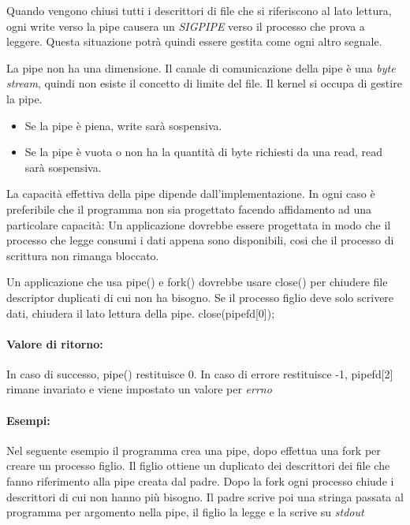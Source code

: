 \documentclass
[10pt,        %
 a4paper,     %
 onecolumn,   %
 fleqn,       %
 oneside,     %
 notitlepage, %
]{article}    %
\begin{document}


Quando vengono chiusi tutti i descrittori di file che si riferiscono al lato lettura, ogni write verso la pipe causera un \textit{SIGPIPE} verso il processo che prova a leggere. Questa situazione potrà quindi essere gestita come ogni altro segnale.



La pipe non ha una dimensione. Il canale di comunicazione della pipe è una \textit{byte stream}, quindi non esiste il concetto di limite del file. Il kernel si occupa di gestire la pipe.
\begin{itemize}
    \item Se la pipe è piena, write sarà sospensiva.
    \item Se la pipe è vuota o non ha la quantità di byte richiesti da una read, read sarà sospensiva.
\end{itemize}

La capacità effettiva della pipe dipende dall'implementazione. In ogni caso è preferibile che il programma non sia progettato facendo affidamento ad una particolare capacità: Un applicazione dovrebbe essere progettata in modo che il processo che legge consumi i dati appena sono disponibili, cosi che il processo di scrittura non rimanga bloccato.

Un applicazione che usa pipe() e fork() dovrebbe usare close() per chiudere file descriptor duplicati di cui non ha bisogno. Se il processo figlio deve solo scrivere dati, chiudera il lato lettura della pipe. close(pipefd[0]);



\paragraph{Valore di ritorno:}
In caso di successo, pipe() restituisce 0. In caso di errore restituisce -1, pipefd[2] rimane invariato e viene impostato un valore per \textit{errno}

\paragraph{Esempi:}
Nel seguente esempio il programma crea una pipe, dopo effettua una fork per creare un processo figlio. Il figlio ottiene un duplicato dei descrittori dei file che fanno riferimento alla pipe creata dal padre. Dopo la fork ogni processo chiude i descrittori di cui non hanno più bisogno. Il padre scrive poi una stringa passata al programma per argomento nella pipe, il figlio la legge e la scrive su \textit{stdout}

\end{document}
